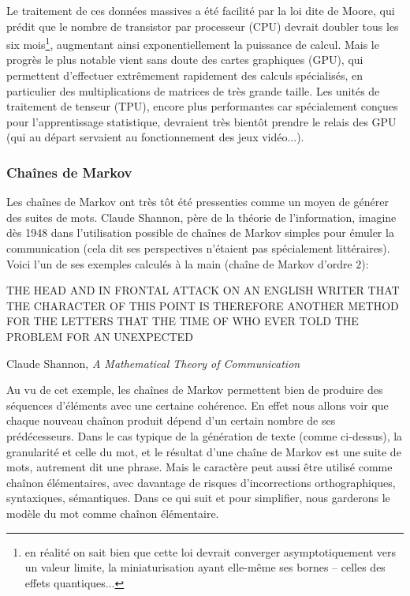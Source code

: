 \documentclass{article}
\newenvironment{citationbox}
{\begin{center}
		\begin{minipage}{.8\textwidth}
		}
		{
		\end{minipage}	
\end{center}
}
\begin{document}
			Le traitement de ces données massives a été facilité par la loi dite de Moore, qui prédit que le nombre de transistor par processeur (CPU) devrait doubler tous les six mois\footnote{en réalité on sait bien que cette loi devrait converger asymptotiquement vers un valeur limite, la miniaturisation ayant elle-même ses bornes -- celles des effets quantiques...}, augmentant ainsi exponentiellement la puissance de calcul. Mais le progrès le plus notable vient sans doute des cartes graphiques (GPU), qui permettent d'effectuer extrêmement rapidement des calculs spécialisés, en particulier des multiplications de matrices de très grande taille. Les unités de traitement de tenseur (TPU), encore plus performantes car spécialement conçues pour l'apprentissage statistique, devraient très bientôt prendre le relais des GPU (qui au départ servaient au fonctionnement des jeux vidéo...).
			\subsubsection{Chaînes de Markov}\label{markov}
				Les chaînes de Markov ont très tôt été pressenties comme un moyen de générer des suites de mots. Claude Shannon, père de la théorie de l'information, imagine dès 1948 dans \cite{shannon1948} l'utilisation possible de chaînes de Markov simples pour émuler la communication (cela dit ses perspectives n'étaient pas spécialement littéraires). Voici l'un de ses exemples calculés à la main (chaîne de Markov d'ordre $2$):
				\begin{citationbox}
					THE HEAD AND IN FRONTAL ATTACK ON AN ENGLISH WRITER THAT THE CHARACTER OF THIS POINT IS THEREFORE ANOTHER METHOD FOR THE LETTERS THAT THE TIME OF WHO EVER TOLD THE PROBLEM FOR AN UNEXPECTED
					\begin{flushright}
						Claude Shannon, \textit{A Mathematical Theory of Communication} \cite{shannon1948}
					\end{flushright}
				\end{citationbox}
				Au vu de cet exemple, les chaînes de Markov permettent bien de produire des séquences d'éléments avec une certaine cohérence. En effet nous allons voir que chaque nouveau chaînon produit dépend d'un certain nombre de ses prédécesseurs. Dans le cas typique de la génération de texte (comme ci-dessus), la granularité et celle du mot, et le résultat d'une chaîne de Markov est une suite de mots, autrement dit une phrase. Mais le caractère peut aussi être utilisé comme chaînon élémentaires, avec davantage de risques d'incorrections orthographiques, syntaxiques, sémantiques. Dans ce qui suit et pour simplifier, nous garderons le modèle du mot comme chaînon élémentaire.\\
				
\end{document}
